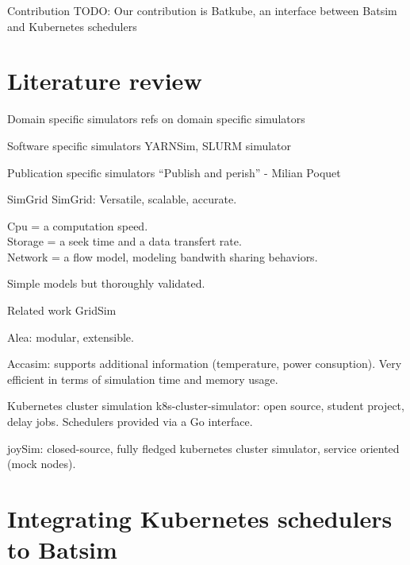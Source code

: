 \documentclass[12pt, aspectratio=43]{beamer}
\begin{document}
\begin{frame}{Contribution}
	TODO: Our contribution is Batkube, an interface between Batsim and
	Kubernetes schedulers
\end{frame}

\section{Literature review}
\begin{frame}{Domain specific simulators}
	refs on domain specific simulators 
\end{frame}

\begin{frame}{Software specific simulators}
	YARNSim, SLURM simulator
\end{frame}

\begin{frame}{Publication specific simulators}
	``Publish and perish'' - Milian Poquet
\end{frame}

\begin{frame}{SimGrid}
	SimGrid: Versatile, scalable, accurate.

	Cpu = a computation speed.\\
	Storage = a seek time and a data transfert rate.\\
	Network = a flow model, modeling bandwith sharing behaviors.

	Simple models but thoroughly validated.
\end{frame}


\begin{frame}{Related work}
	GridSim

	Alea: modular, extensible.

	Accasim: supports additional information (temperature, power
	consuption). Very efficient in terms of simulation time and memory
	usage.
\end{frame}

\begin{frame}{Kubernetes cluster simulation}
	k8s-cluster-simulator: open source, student project, delay jobs.
	Schedulers provided via a Go interface.

	joySim: closed-source, fully fledged kubernetes cluster simulator,
	service oriented (mock nodes).
\end{frame}

\section{Integrating Kubernetes schedulers to Batsim}
\end{document}
